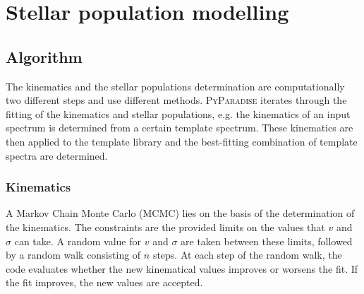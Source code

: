 \documentclass[usenatbib,usegraphicx,useAMS,onecolumn]{mn2e}
\newcommand{\codeline}[1]{\lstinline|#1|}
\newcommand{\paramdef}[1]{\textcolor{red}{\codeline{#1}}}
\newcommand{\fname}[1]{\textcolor{magenta}{\codeline{#1}}}
\begin{document}

\section{Stellar population modelling}
\label{sec:ssp_model}
\subsection{Algorithm}
\label{subsec:ssp_algo}
The kinematics and the stellar populations determination are computationally two different steps and use different methods.
\textsc{PyParadise} iterates through the fitting of the kinematics and stellar populations, e.g. the kinematics of an input spectrum is determined from a certain template spectrum.
These kinematics are then applied to the template library and the best-fitting combination of template spectra are determined.

\subsubsection{Kinematics}
\label{subsec:ssp_kin}
A Markov Chain Monte Carlo (MCMC) lies on the basis of the determination of the kinematics.
The constraints are the provided limits on the values that $v$ and $\sigma$ can take.
A random value for $v$ and $\sigma$ are taken between these limits, followed by a random walk consisting of $n$ steps.
At each step of the random walk, the code evaluates whether the new kinematical values improves or worsens the fit.
If the fit improves, the new values are accepted.
\end{document}
